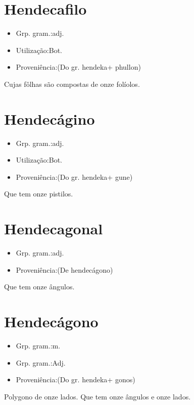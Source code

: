 \documentclass{article}
\begin{document}
\section{Hendecafilo}
\begin{itemize}
\item {Grp. gram.:adj.}
\end{itemize}
\begin{itemize}
\item {Utilização:Bot.}
\end{itemize}
\begin{itemize}
\item {Proveniência:(Do gr. \textunderscore hendeka\textunderscore  + \textunderscore phullon\textunderscore )}
\end{itemize}
Cujas fôlhas são compostas de onze folíolos.
\section{Hendecágino}
\begin{itemize}
\item {Grp. gram.:adj.}
\end{itemize}
\begin{itemize}
\item {Utilização:Bot.}
\end{itemize}
\begin{itemize}
\item {Proveniência:(Do gr. \textunderscore hendeka\textunderscore  + \textunderscore gune\textunderscore )}
\end{itemize}
Que tem onze pistilos.
\section{Hendecagonal}
\begin{itemize}
\item {Grp. gram.:adj.}
\end{itemize}
\begin{itemize}
\item {Proveniência:(De \textunderscore hendecágono\textunderscore )}
\end{itemize}
Que tem onze ângulos.
\section{Hendecágono}
\begin{itemize}
\item {Grp. gram.:m.}
\end{itemize}
\begin{itemize}
\item {Grp. gram.:Adj.}
\end{itemize}
\begin{itemize}
\item {Proveniência:(Do gr. \textunderscore hendeka\textunderscore  + \textunderscore gonos\textunderscore )}
\end{itemize}
Polygono de onze lados.
Que tem onze ângulos e onze lados.
\end{document}
